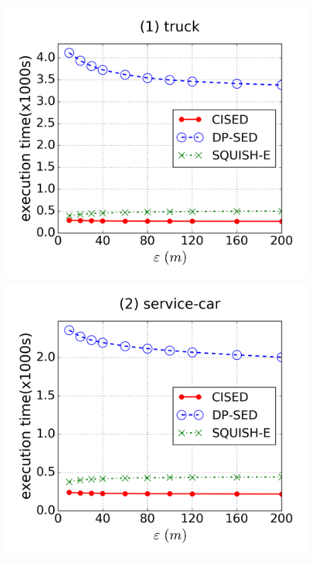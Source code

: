 \begin{figure}[tb!]
\centering
\includegraphics[scale = 0.24]{figures/Exp-time-epsilon-truck.png}
\includegraphics[scale = 0.24]{figures/Exp-time-epsilon-service.png}

\end{figure}
